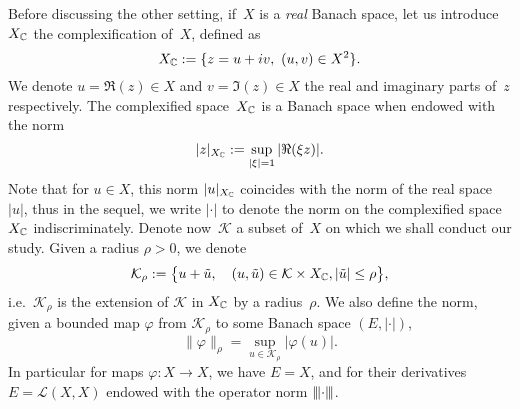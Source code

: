Before discussing the other setting, if~$X$ is a \textit{real} Banach
space, let us introduce~$X_{\mathbb{C}}$ the complexification of~$X$, defined
as 
\begin{equation*}
  X_{\setC} := \{ z = u + iv,\ (u,v) \in X^2 \} .
\end{equation*}
We denote $u = \Re(z) \in X$ and $v = \Im(z) \in X$ the real and
imaginary parts of~$z$ respectively. The complexified space~$X_{\mathbb{C}}$ is a
Banach space when endowed with the norm 
\begin{equation*}
  |z|_{X_{\mathbb{C}}} := \sup_{|\xi| = 1} |\Re(\xi z)|. 
\end{equation*}
Note that for $u \in X$, this norm $|u|_{X_{\mathbb{C}}}$ coincides with the norm
of the real space $|u|$, thus in the sequel, we write $|\cdot|$ to
denote the norm on the complexified space $X_{\mathbb{C}}$ indiscriminately.
Denote now~$\mathcal{K}$ a subset of~$X$ on which we shall conduct our
study. Given a radius $\rho > 0$, we denote 
\begin{equation*}
  \mathcal{K}_{\rho} := \big\{
    u + \tilde{u}, \quad 
      (u,\tilde{u}) \in \mathcal{K} \times X_{\mathbb{C}}, 
      |\tilde{u}| \leq \rho
  \big\} ,
\end{equation*}
i.e.~$\mathcal{K}_\rho$ is the extension of $\mathcal{K}$ in $X_{\mathbb{C}}$ by a
radius~$\rho$. We also define the norm, given a bounded map $\varphi$ from
$\mathcal{K}_\rho$ to some Banach space $(E, |\cdot|)$, 
\begin{equation*}
  \| \varphi \|_\rho = \sup_{u \in \mathcal{K}_\rho} |\varphi(u) |.
\end{equation*}
In particular for maps $\varphi: X \rightarrow X$, we have $E = X$, and
for their derivatives $E = \mathcal{L}(X,X)$ endowed with the operator
norm ${\left\vert\kern-0.25ex\left\vert\kern-0.25ex\left\vert \cdot \right\vert\kern-0.25ex\right\vert\kern-0.25ex\right\vert}$. 

